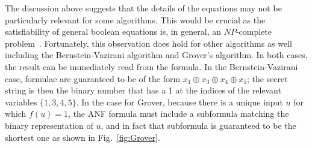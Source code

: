 \documentclass[sigplan]{acmart}
\begin{document}
The discussion above suggests that the details of the equations may
not be particularly relevant for some algorithms. This would be
crucial as the satisfiability of general boolean equations is, in
general, an $\mathit{NP}$-complete
problem~\cite{4640789,Karp1972,10.1145/800157.805047}. Fortunately,
this observation does hold for other algorithms as well including the
Bernstein-Vazirani algorithm and Grover's algorithm. In both cases,
the result can be immediately read from the formula. In the
Bernstein-Vazirani case, formulae are guaranteed to be of the form
$x_1 \oplus x_3 \oplus x_4 \oplus x_5$; the secret string is then the
binary number that has a 1 at the indices of the relevant variables
$\{ 1,3,4,5 \}$. In the case for Grover, because there is a unique
input $u$ for which $f(u) = 1$, the ANF formula must include a
subformula matching the binary representation of $u$, and in fact that
subformula is guaranteed to be the shortest one as shown in
Fig.~\ref{fig:Grover}.
\end{document}

